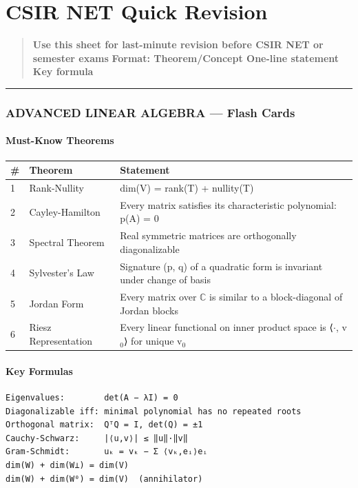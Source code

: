 \documentclass[12pt,a4paper,openany]{book}
\begin{document}
{{\chapter{CSIR NET Quick Revision}


\begin{quote}
\textbf{Use this sheet for last-minute revision before CSIR NET or semester exams}
\textbf{Format: Theorem/Concept  One-line statement  Key formula}
\end{quote}

\bigskip\noindent\rule{\textwidth}{0.4pt}\bigskip

\subsection{ ADVANCED LINEAR ALGEBRA — Flash Cards}

\subsubsection{Must-Know Theorems}
\begin{center}
\begin{tabular}{|l|l|l|}
\hline
\textbf{#} & \textbf{Theorem} & \textbf{Statement} \\
\hline
1 & Rank-Nullity & dim(V) = rank(T) + nullity(T) \\
\hline
2 & Cayley-Hamilton & Every matrix satisfies its characteristic polynomial: p(A) = 0 \\
\hline
3 & Spectral Theorem & Real symmetric matrices are orthogonally diagonalizable \\
\hline
4 & Sylvester's Law & Signature (p, q) of a quadratic form is invariant under change of basis \\
\hline
5 & Jordan Form & Every matrix over $\mathbb{C}$ is similar to a block-diagonal of Jordan blocks \\
\hline
6 & Riesz Representation & Every linear functional on inner product space is ⟨$\cdot$, v$_0$⟩ for unique v$_0$ \\
\hline
\end{tabular}
\end{center}

\subsubsection{Key Formulas}
\begin{verbatim}
Eigenvalues:        det(A − λI) = 0
Diagonalizable iff: minimal polynomial has no repeated roots
Orthogonal matrix:  QᵀQ = I, det(Q) = ±1
Cauchy-Schwarz:     |⟨u,v⟩| ≤ ‖u‖·‖v‖
Gram-Schmidt:       uₖ = vₖ − Σ ⟨vₖ,eᵢ⟩eᵢ
dim(W) + dim(W⊥) = dim(V)
dim(W) + dim(W⁰) = dim(V)  (annihilator)
\end{verbatim}

}}
\end{document}

